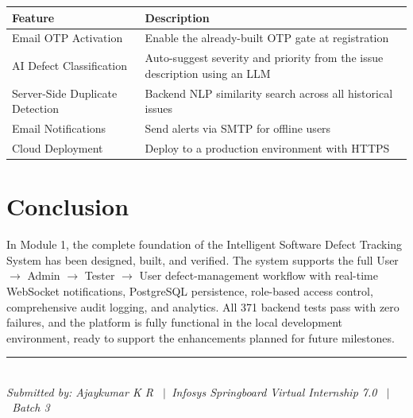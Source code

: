 \documentclass[11pt]{article}
\newcommand{\tblhead}[1]{\rowcolor{accent}\color{white}\bfseries #1}
\begin{document}
\renewcommand{\arraystretch}{1.25}
\begin{tabular}{|L{4.2cm}|L{11.6cm}|}
\hline
\tblhead{Feature} & \tblhead{Description} \\
\hline
Email OTP Activation & Enable the already-built OTP gate at registration \\
\hline
AI Defect Classification & Auto-suggest severity and priority from the issue description using an LLM \\
\hline
Server-Side Duplicate Detection & Backend NLP similarity search across all historical issues \\
\hline
Email Notifications & Send alerts via SMTP for offline users \\
\hline
Cloud Deployment & Deploy to a production environment with HTTPS \\
\hline
\end{tabular}
\endrowcolors

\section{Conclusion}

In Module 1, the complete foundation of the Intelligent Software Defect Tracking System has been designed, built, and verified. The system supports the full User $\rightarrow$ Admin $\rightarrow$ Tester $\rightarrow$ User defect-management workflow with real-time WebSocket notifications, PostgreSQL persistence, role-based access control, comprehensive audit logging, and analytics. All 371 backend tests pass with zero failures, and the platform is fully functional in the local development environment, ready to support the enhancements planned for future milestones.

\vspace{1cm}
\begin{center}
\rule{0.9\textwidth}{0.4pt}\\[6pt]
{\small\itshape\color{gray666} Submitted by: Ajaykumar K R \ $|$\ Infosys Springboard Virtual Internship 7.0 \ $|$\ Batch 3}
\end{center}
\end{document}
